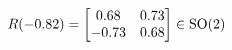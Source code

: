\documentclass[preview]{standalone}
\begin{document}
\begin{align*}
\special{dvisvgm:raw <g id='unique000'>}R(-0.82) = \begin{bmatrix} 0.68 & 0.73 \\ -0.73 & 0.68 \end{bmatrix} \in \text{SO}(2)\special{dvisvgm:raw </g>}
\end{align*}
\end{document}
